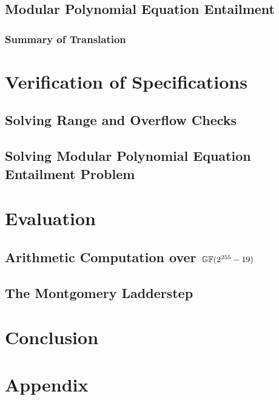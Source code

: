 \documentclass[sigconf]{acmart}
\begin{document}
\subsection{Modular Polynomial Equation Entailment}
\label{subsection:translation:multivariant-polynomial-equations}


\subsubsection*{Summary of Translation}



\section{Verification of Specifications}
\label{section:verification-of-specifications}


\subsection{Solving Range and Overflow Checks}
\label{subsection:solving-range-overflow-checks}


\subsection{Solving Modular Polynomial Equation Entailment Problem}
\label{subsection:solving-algebraic-equations}



\section{Evaluation}
\label{section:evaluation}


\subsection{Arithmetic Computation over $\mathbb{GF}(2^{255}-19)$}
\label{subection:evaluation:multiplication}


\subsection{The Montgomery Ladderstep}
\label{subsection:evaluation:ladder-step}


\section{Conclusion}
\label{section:conclusion}





\appendix
\section{Appendix}
\label{section:appendix}


\end{document}
